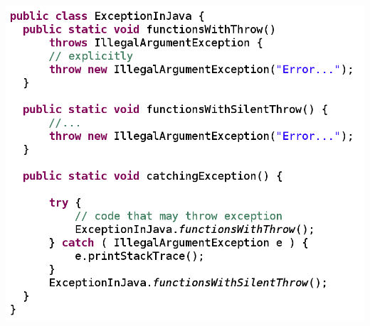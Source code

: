 { \begin{frame}
   \begin{center}
     \includegraphics[scale=0.30]{img/exception-in-java.png}
   \end{center}
 \end{frame}
}



